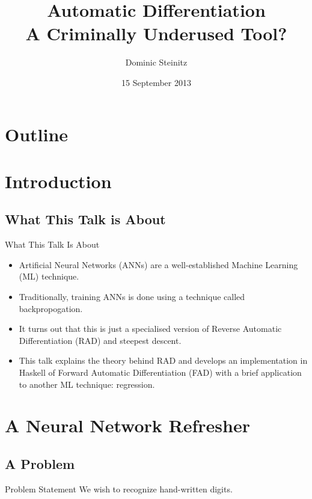 \documentclass{beamer}
\title[Automatic differentiation]{Automatic Differentiation\\A Criminally Underused Tool?}
\author{Dominic Steinitz}
\institute{Kingston University}
\date{15 September 2013}
\begin{document}
\begin{frame}
\titlepage
\end{frame}

\section*{Outline}
    \frame{\tableofcontents}

\section{Introduction}

\subsection{What This Talk is About}

\begin{frame}{What This Talk Is About}

  \begin{itemize}
  \item Artificial Neural Networks (ANNs) are a well-established
    Machine Learning (ML) technique.
  \item Traditionally, training ANNs is done using a technique called
    backpropogation.
  \item It turns out that this is just a specialised version of
    Reverse Automatic Differentiation (RAD) and steepest descent.
  \item This talk explains the theory behind RAD and develops an
    implementation in Haskell of Forward Automatic Differentiation
    (FAD) with a brief application to another ML technique:
    regression.
  \end{itemize}

\end{frame}

\section{A Neural Network Refresher}

\subsection{A Problem}

\begin{frame}[fragile]{Problem Statement}
We wish to recognize hand-written digits.
\end{frame}
\end{document}
